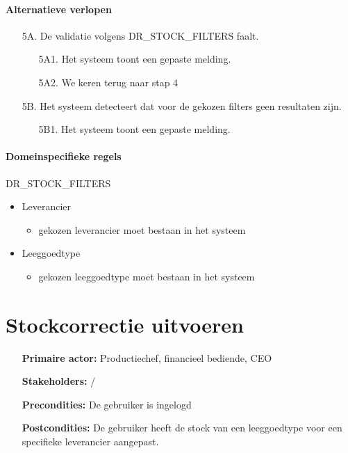     \paragraph{Alternatieve verlopen}
    \begin{itemize}[nosep]
        \item[5A.] De validatie volgens DR\_STOCK\_FILTERS faalt.
        \begin{itemize}
            \item[5A1.] Het systeem toont een gepaste melding.
            \item[5A2.] We keren terug naar stap 4
        \end{itemize}

        \item[5B.] Het systeem detecteert dat voor de gekozen filters geen resultaten zijn.
        \begin{itemize}
            \item[5B1.] Het systeem toont een gepaste melding.
        \end{itemize}
    \end{itemize}

    \paragraph{Domeinspecifieke regels}
    DR\_STOCK\_FILTERS
    \begin{itemize}
        \item Leverancier
        \begin{itemize}
            \item gekozen leverancier moet bestaan in het systeem
        \end{itemize}
        \item Leeggoedtype
        \begin{itemize}
            \item gekozen leeggoedtype moet bestaan in het systeem
        \end{itemize}
    \end{itemize}

    \vspace{1cm}
\pagebreak
\section{Stockcorrectie uitvoeren}
\label{uc:stockcorrectie-uitvoeren}

    \begin{itemize}[leftmargin=3.5cm, labelsep=0.5cm, nosep]
        \item[\textbf{Primaire actor:}] Productiechef, financieel bediende, CEO
        \item[\textbf{Stakeholders:}] /
        \item[\textbf{Precondities:}] De gebruiker is ingelogd
        \item[\textbf{Postcondities:}] De gebruiker heeft de stock van een leeggoedtype voor een specifieke leverancier aangepast.
    \end{itemize}

